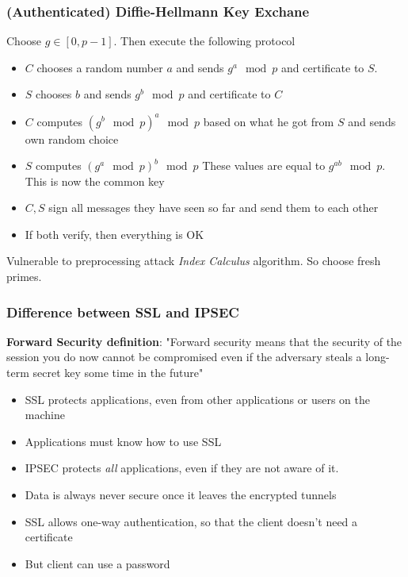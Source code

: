 \documentclass[14pt]{beamer}
\begin{document}
    \begin{frame}
           \frametitle{(Authenticated) Diffie-Hellmann Key Exchane}
            Choose $g \in [0, p-1]$. Then execute the following protocol
            \begin{itemize}
                \item $C$ chooses a random number $a$ and sends $g^a \mod p$ and certificate to $S$. 
                \item $S$ chooses $b$ and sends $g^b \mod p$ and certificate to $C$
                \item $C$ computes $(g^b \mod p)^a \mod p$ based on what he got from $S$ and sends own random choice
                \item $S$ computes $(g^a \mod p)^b \mod p$ These values are equal to $g^{ab} \mod p$. This is now the common key
                \item $C, S$ sign all messages they have seen so far and send them to each other
                \item If both verify, then everything is OK
            \end{itemize}
            Vulnerable to preprocessing attack \textit{Index Calculus} algorithm. So choose fresh primes.
    \end{frame}



    \begin{frame}
        \frametitle{Difference between SSL and IPSEC}
        \textbf{Forward Security definition}: "Forward security means that the security of the session you do now cannot be compromised even if the adversary steals a long-term secret key some time in the future"
        \begin{itemize}
            \item SSL protects applications, even from other applications or users on the machine
            \item Applications must know how to use SSL
            \item IPSEC protects \textit{all} applications, even if they are not aware of it. 
            \item Data is always never secure once it leaves the encrypted tunnels
            \item SSL allows one-way authentication, so that the client doesn't need a certificate
            \item But client can use a password
        \end{itemize}
    \end{frame}
\end{document}
